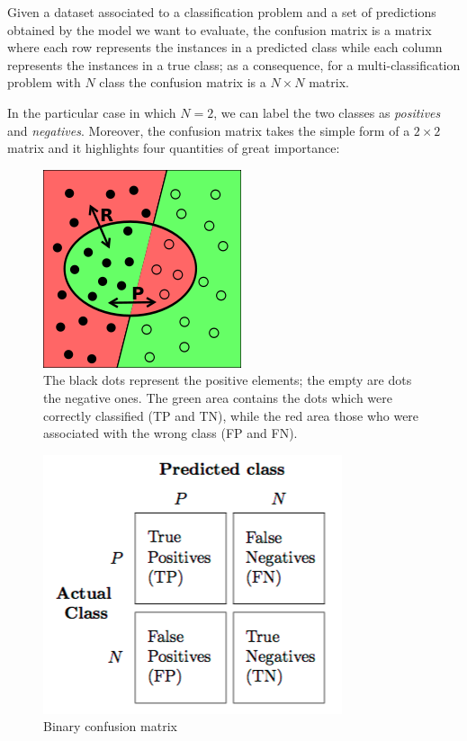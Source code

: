 \documentclass[a4paper, twoside]{article}
\begin{document}
    Given a dataset associated to a classification problem and a set of predictions obtained by the model we want to evaluate, the confusion matrix is a matrix where each row represents the instances in a predicted class while each column represents the instances in a true class; as a consequence, for a multi-classification problem with $N$ class the confusion matrix is a $N \times N$ matrix.

    In the particular case in which $N = 2$, we can label the two classes as \textit{positives} and \textit{negatives}. Moreover, the confusion matrix takes the simple form of a $2 \times 2$ matrix and it highlights four quantities of great importance:


    \begin{figure}
  \begin{center}

     \includegraphics[width=0.6\linewidth]{220px-Recall-precision.png}
     \caption{The black dots represent the positive elements; the empty are dots the negative ones. The green area contains the dots which were correctly classified (TP and TN), while the red area those who were associated with the wrong class (FP and FN).}
  \end{center}
\end{figure}


    \begin{figure}[H]
    \centering
    \includegraphics[width=0.5\linewidth]{confusion_matrix_1.png}
    \caption{Binary confusion matrix}
    \end{figure}
\end{document}
